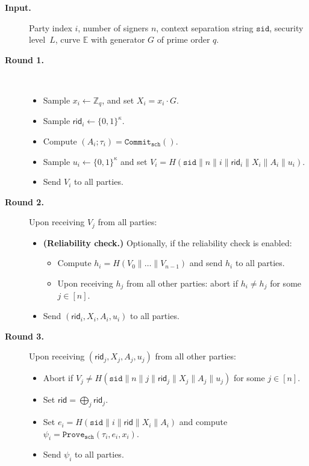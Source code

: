 \documentclass[11pt]{article}
\newcommand{\sid}{\ensuremath{\mathtt{sid}}}
\newcommand{\commit}[1]{\ensuremath{\mathtt{Commit}_{\mathtt{#1}}}}
\newcommand{\prove}[1]{\ensuremath{\mathtt{Prove}_{\mathtt{#1}}}}
\newcommand{\rid}{\textsf{rid}}
\newcommand{\E}{\mathbb{E}}
\newcommand{\Z}{\mathbb{Z}}
\newcommand{\?}[1]{\stackrel{?}{#1}}
\begin{document}
\begin{description}
\item[\bf Input.]
    Party index $i$,
    number of signers $n$,
    context separation string \sid,
    security level~$L$,
    curve $\E$ with generator $G$ of prime order $q$.

\item[\bf Round 1.] \
\begin{itemize}
    \item Sample $x_i \gets \Z_q$, 
          and set $X_i = x_i \cdot G$.
    \item Sample $\rid_i \gets \{0,1\}^\kappa$.
    \item Compute $(A_i; \tau_i) = \commit{sch}()$.
    \item Sample $u_i \gets \{0,1\}^\kappa$
          and set $V_i = H(\sid \| n \| i \| \rid_i \| X_i \| A_i \| u_i)$.
    \item Send $V_i$ to all parties.
\end{itemize}

\item[\bf Round 2.] Upon receiving $V_j$ from all parties:
\begin{itemize}
    \item {\bf (Reliability check.)} Optionally, if the reliability check is enabled:
\begin{itemize}
    \item Compute $h_i = H(V_0 \| \dots \| V_{n-1})$ and
        send $h_i$ to all parties.
    
    \item Upon receiving $h_j$ from all other parties: abort if $h_i \neq h_j$ for some $j\in [n]$.
\end{itemize}
    \item Send $(\rid_i, X_i, A_i, u_i)$ to all parties.
    \end{itemize}

\item[\bf Round 3.] 
    Upon receiving $(\rid_j, X_j, A_j, u_j)$ from all other parties:
    \begin{itemize}
    \item Abort if $V_j \neq H(\sid \| n \| j \| \rid_j \| X_j \| A_j \| u_j)$
          for some $j \in [n]$.
    \item Set $\rid = \bigoplus_j \rid_j$.
    \item Set $e_i = H(\sid \| i \| \rid \| X_i\|A_i)$
          and compute $\psi_i = \prove{sch}(\tau_i, e_i, x_i)$.
    \item Send $\psi_i$ to all parties.
    \end{itemize}


\end{description}
\end{document}
